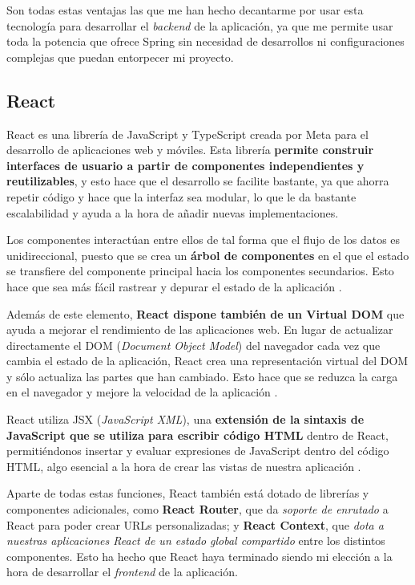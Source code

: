 Son todas estas ventajas las que me han hecho decantarme por usar esta tecnología para desarrollar el \textit{backend} de la aplicación, ya que me permite usar toda la potencia que ofrece Spring sin necesidad de desarrollos ni configuraciones complejas que puedan entorpecer mi proyecto.

\subsection{React}

React es una librería de JavaScript y TypeScript creada por Meta para el desarrollo de aplicaciones web y móviles. Esta librería \textbf{permite construir interfaces de usuario a partir de componentes independientes y reutilizables}, y esto hace que el desarrollo se facilite bastante, ya que ahorra repetir código y hace que la interfaz sea modular, lo que le da bastante escalabilidad y ayuda a la hora de añadir nuevas implementaciones.

Los componentes interactúan entre ellos de tal forma que el flujo de los datos es unidireccional, puesto que se crea un \textbf{árbol de componentes} en el que el estado se transfiere del componente principal hacia los componentes secundarios. Esto hace que sea más fácil rastrear y depurar el estado de la aplicación \cite{kinsta:react}.


Además de este elemento, \textbf{React dispone también de un Virtual DOM} que ayuda a mejorar el rendimiento de las aplicaciones web. En lugar de actualizar directamente el DOM (\textit{Document Object Model}) del navegador cada vez que cambia el estado de la aplicación, React crea una representación virtual del DOM y sólo actualiza las partes que han cambiado. Esto hace que se reduzca la carga en el navegador y mejore la velocidad de la aplicación \cite{geeksforgeeks:virtual-dom}.


React utiliza JSX (\textit{JavaScript XML}), una \textbf{extensión de la sintaxis de JavaScript que se utiliza para escribir código HTML} dentro de React, permitiéndonos insertar y evaluar expresiones de JavaScript dentro del código HTML, algo esencial a la hora de crear las vistas de nuestra aplicación \cite{react-docs:jsx}.

Aparte de todas estas funciones, React también está dotado de librerías y componentes adicionales, como \textbf{React Router}, que da \textit{soporte de enrutado} a React para poder crear URLs personalizadas; y \textbf{React Context}, que \textit{dota a nuestras aplicaciones React de un estado global compartido} entre los distintos componentes. Esto ha hecho que React haya terminado siendo mi elección a la hora de desarrollar el \textit{frontend} de la aplicación.

